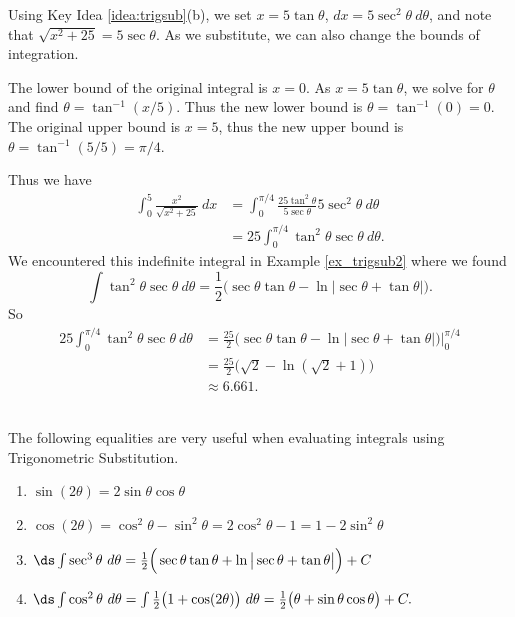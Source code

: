 {Using Key Idea \ref{idea:trigsub}(b), we set $x=5\tan\theta$, $dx = 5\sec^2\theta\ d\theta$, and note that $\sqrt{x^2+25} = 5\sec\theta$. As we substitute, we can also change the bounds of integration.

The lower bound of the original integral is $x=0$. As $x=5\tan\theta$, we solve for $\theta$ and find $\theta = \tan^{-1}(x/5)$. Thus the new lower bound is $\theta = \tan^{-1}(0) = 0$. The original upper bound is $x=5$, thus the new upper bound is $\theta = \tan^{-1}(5/5) = \pi/4$. 

Thus we have 
\begin{align*}
\int_0^5\frac{x^2}{\sqrt{x^2+25}}\ dx &= \int_0^{\pi/4} \frac{25\tan^2\theta}{5\sec\theta}5\sec^2\theta\ d\theta\\
		&= 25\int_0^{\pi/4} \tan^2\theta\sec\theta\ d\theta.
\end{align*}
We encountered this indefinite integral in Example \ref{ex_trigsub2} where we found 
\[
\int \tan^2\theta\sec\theta \ d\theta = \frac12\big(\sec\theta\tan\theta-\ln|\sec\theta+\tan\theta|\big).
\]
So
\begin{align*}
25\int_0^{\pi/4} \tan^2\theta\sec\theta\ d\theta &= \frac{25}2\big(\sec\theta\tan\theta-\ln|\sec\theta+\tan\theta|\big)\Bigg|_0^{\pi/4}\\
&= \frac{25}2\big(\sqrt2-\ln(\sqrt2+1)\big)\\
&\approx 6.661.
\end{align*}
\baselineskip
}\\

\enlargethispage{3\baselineskip}
The following equalities are very useful when evaluating integrals using Trigonometric Substitution. 

{\begin{enumerate}
	\item	$\sin(2\theta) = 2\sin\theta\cos\theta$
	\item	$\cos(2\theta) = \cos^2\theta - \sin^2\theta = 2\cos^2\theta-1 = 1-2\sin^2\theta$
	\item $\ds \int \sec^3\theta\ d\theta = \frac12\Big(\sec \theta\tan \theta + \ln\big|\sec \theta+\tan \theta\big|\Big)+C$
	\item	$\ds \int \cos^2\theta\ d\theta = \int \frac12\big(1+\cos(2\theta)\big)\ d\theta = \frac12\big(\theta+\sin\theta\cos\theta\big)+C.$
\end{enumerate}
}

